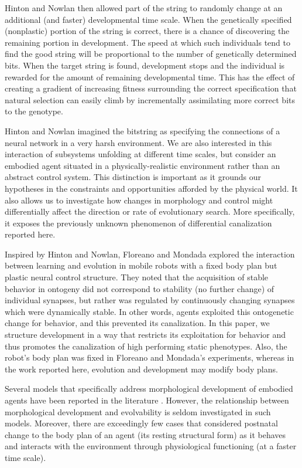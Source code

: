 Hinton and Nowlan then allowed part of the string to randomly change at an additional (and faster) developmental time scale.
When the genetically specified (nonplastic) portion of the string is correct, there is a chance of discovering the remaining portion in development.	
The speed at which such individuals tend to find the good string will be proportional to the number of genetically determined bits.
When the target string is found, development stops and the individual is rewarded for the amount of remaining developmental time.
This has the effect of creating a gradient of increasing fitness surrounding the correct specification that natural selection can easily climb by incrementally assimilating more correct bits to the genotype.


Hinton and Nowlan imagined the bitstring as specifying the connections of a neural network in a very harsh environment.
We are also interested in this interaction of subsystems unfolding at different time scales, but consider an embodied agent situated in a physically-realistic environment rather than an abstract control system.
This distinction is important as it grounds our hypotheses in the constraints and opportunities afforded by the physical world.
It also allows us to investigate how changes in morphology and control might differentially affect the direction or rate of evolutionary search.
More specifically, it exposes the previously unknown phenomenon of differential canalization reported here.

Inspired by Hinton and Nowlan, Floreano and Mondada \cite{floreano1996plastic} explored the interaction between learning and evolution in mobile robots with a fixed body plan but plastic neural control structure.
They noted that the acquisition of stable behavior in ontogeny did not correspond to stability (no further change) of individual synapses, but rather was regulated by continuously changing synapses which were dynamically stable.
In other words, agents exploited this ontogenetic change for behavior, and this prevented its canalization.
In this paper, we structure development in a way that restricts its exploitation for behavior and thus promotes the canalization of high performing static phenotypes.
Also, the robot's body plan was fixed in Floreano and Mondada's experiments\cite{floreano1996plastic}, whereas in the work reported here, evolution and development may modify body plans.


Several models that specifically address morphological development of embodied agents have been reported in the literature
\cite{dellaert1996developmental,Eggenberger97,Bongard01,miller2004evolving,doursat2009organically}.
However, the relationship between morphological development and evolvability is seldom investigated in such models.
Moreover, there are exceedingly few cases that considered postnatal change to the body plan of an agent (its resting structural form) as it behaves and interacts with the environment through physiological functioning (at a faster time scale).


